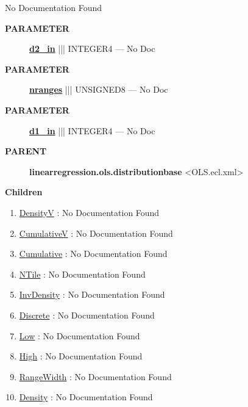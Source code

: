 \par





No Documentation Found






\par
\begin{description}
\item [\colorbox{tagtype}{\color{white} \textbf{\textsf{PARAMETER}}}] \textbf{\underline{d2\_in}} ||| INTEGER4 --- No Doc
\item [\colorbox{tagtype}{\color{white} \textbf{\textsf{PARAMETER}}}] \textbf{\underline{nranges}} ||| UNSIGNED8 --- No Doc
\item [\colorbox{tagtype}{\color{white} \textbf{\textsf{PARAMETER}}}] \textbf{\underline{d1\_in}} ||| INTEGER4 --- No Doc
\end{description}









\par
\begin{description}
\item [\colorbox{tagtype}{\color{white} \textbf{\textsf{PARENT}}}] \textbf{linearregression.ols.distributionbase} <OLS.ecl.xml>
\end{description}


\textbf{Children}
\begin{enumerate}
\item \hyperlink{ecldoc:linearregression.ols.distributionbase.densityv}{DensityV}
: No Documentation Found
\item \hyperlink{ecldoc:linearregression.ols.distributionbase.cumulativev}{CumulativeV}
: No Documentation Found
\item \hyperlink{ecldoc:linearregression.ols.distributionbase.cumulative}{Cumulative}
: No Documentation Found
\item \hyperlink{ecldoc:linearregression.ols.distributionbase.ntile}{NTile}
: No Documentation Found
\item \hyperlink{ecldoc:linearregression.ols.distributionbase.invdensity}{InvDensity}
: No Documentation Found
\item \hyperlink{ecldoc:linearregression.ols.distributionbase.discrete}{Discrete}
: No Documentation Found
\item \hyperlink{ecldoc:linearregression.ols.fdistribution.low}{Low}
: No Documentation Found
\item \hyperlink{ecldoc:linearregression.ols.fdistribution.high}{High}
: No Documentation Found
\item \hyperlink{ecldoc:linearregression.ols.fdistribution.rangewidth}{RangeWidth}
: No Documentation Found
\item \hyperlink{ecldoc:linearregression.ols.fdistribution.density}{Density}
: No Documentation Found
\end{enumerate}

